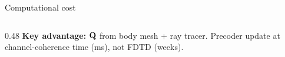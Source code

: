 \begin{frame}[label=app-p3-cost]{Computational cost}
\begin{columns}[T]
\begin{column}{0.48\textwidth}
      \vspace{4pt}
      {\small \textbf{Key advantage:}
      $\mathbf{Q}$ from body mesh + ray tracer.
      Precoder update at channel-coherence time (ms), not FDTD (weeks).}
    \end{column}
  \end{columns}

  \vspace{4pt}
\end{frame}
